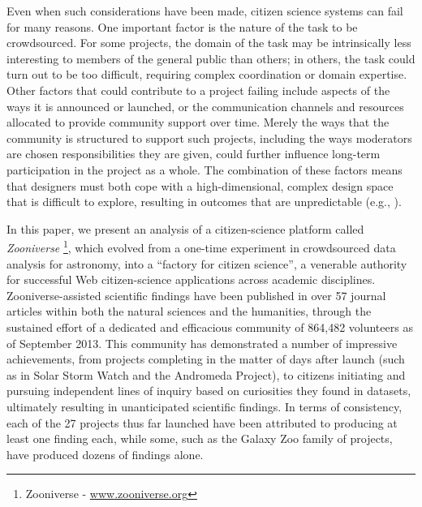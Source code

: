 \documentclass{sigchi}
\begin{document}
Even when such considerations have been made, citizen science systems can fail for many reasons. One important factor is the nature of the task to be crowdsourced. For some projects, the domain of the task may be intrinsically less interesting to members of the general public than others; in others, the task could turn out to be too difficult, requiring complex coordination or domain expertise. Other factors that could contribute to a project failing include aspects of the ways it is announced or launched, or the communication channels and resources allocated to provide community support over time.  Merely the ways that the community is structured to support such projects, including the ways moderators are chosen responsibilities they are given, could further influence long-term participation in the project as a whole. The combination of these factors means that designers must both cope with a high-dimensional, complex design space that is difficult to explore, resulting in outcomes that are unpredictable (e.g., \cite{ebird, ubiome, druschke2012failures}).

In this paper, we present an analysis of a citizen-science platform called \emph{Zooniverse} \footnote{Zooniverse - \url{www.zooniverse.org}}, which evolved from a one-time experiment in crowdsourced data analysis for astronomy, into a ``factory for citizen science'', a venerable authority for successful Web citizen-science applications across academic disciplines. Zooniverse-assisted scientific findings have been published in over 57 journal articles within both the natural sciences and the humanities, through the sustained effort of a dedicated and efficacious community of 864,482 volunteers as of September 2013.  This community has demonstrated a number of impressive achievements, from projects completing in the matter of days after launch (such as in Solar Storm Watch and the Andromeda Project), to citizens initiating and pursuing independent lines of inquiry based on curiosities they found in datasets, ultimately resulting in unanticipated scientific findings.  In terms of consistency, each of the 27 projects thus far launched have been attributed to producing at least one finding each, while some, such as the Galaxy Zoo family of projects, have produced dozens of findings alone.
\end{document}
